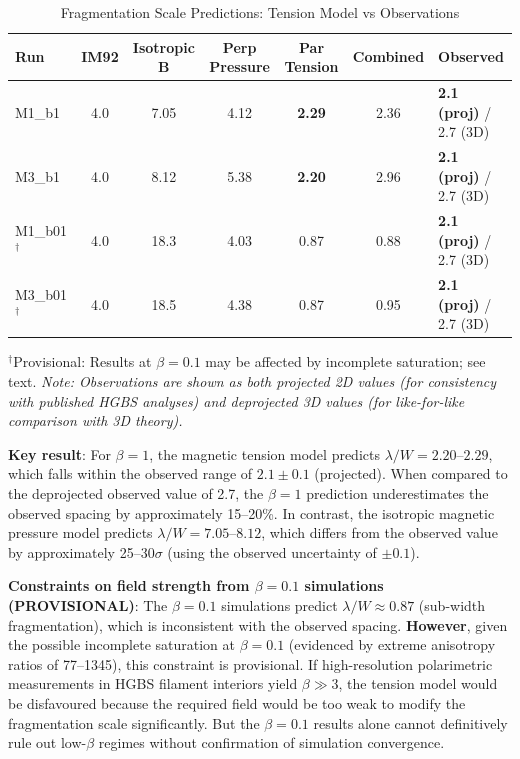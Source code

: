 \documentclass[11pt,a4paper]{article}
\begin{document}
\begin{table}[H]
\centering
\caption{Fragmentation Scale Predictions: Tension Model vs Observations}
\label{tab:fragmentation_predictions}
\begin{tabular}{lccccc}
\toprule
Run & IM92 & Isotropic B & Perp Pressure & \textbf{Par Tension} & Combined & \textbf{Observed} \\
\midrule
M1\_b1  & 4.0 & 7.05 & 4.12 & \textbf{2.29} & 2.36 & \textbf{2.1 (proj)} / 2.7 (3D) \\
M3\_b1  & 4.0 & 8.12 & 5.38 & \textbf{2.20} & 2.96 & \textbf{2.1 (proj)} / 2.7 (3D) \\
M1\_b01$^{\dagger}$ & 4.0 & 18.3 & 4.03 & 0.87 & 0.88 & \textbf{2.1 (proj)} / 2.7 (3D) \\
M3\_b01$^{\dagger}$ & 4.0 & 18.5 & 4.38 & 0.87 & 0.95 & \textbf{2.1 (proj)} / 2.7 (3D) \\
\bottomrule
\end{tabular}
\vspace{-0.5em}
\small{$^{\dagger}$Provisional: Results at $\beta = 0.1$ may be affected by incomplete saturation; see text. \textit{Note: Observations are shown as both projected 2D values (for consistency with published HGBS analyses) and deprojected 3D values (for like-for-like comparison with 3D theory).}}
\end{table}

\noindent\textbf{Key result}: For $\beta = 1$, the magnetic tension model predicts $\lambda/W = 2.20$--$2.29$, which falls within the observed range of $2.1 \pm 0.1$ (projected). When compared to the deprojected observed value of 2.7, the $\beta = 1$ prediction underestimates the observed spacing by approximately 15--20\%. In contrast, the isotropic magnetic pressure model predicts $\lambda/W = 7.05$--$8.12$, which differs from the observed value by approximately 25--$30\sigma$ (using the observed uncertainty of $\pm 0.1$).

\textbf{Constraints on field strength from $\beta = 0.1$ simulations (PROVISIONAL)}: The $\beta = 0.1$ simulations predict $\lambda/W \approx 0.87$ (sub-width fragmentation), which is inconsistent with the observed spacing. \textbf{However}, given the possible incomplete saturation at $\beta = 0.1$ (evidenced by extreme anisotropy ratios of 77--1345), this constraint is provisional. If high-resolution polarimetric measurements in HGBS filament interiors yield $\beta \gg 3$, the tension model would be disfavoured because the required field would be too weak to modify the fragmentation scale significantly. But the $\beta = 0.1$ results alone cannot definitively rule out low-$\beta$ regimes without confirmation of simulation convergence.
\end{document}

